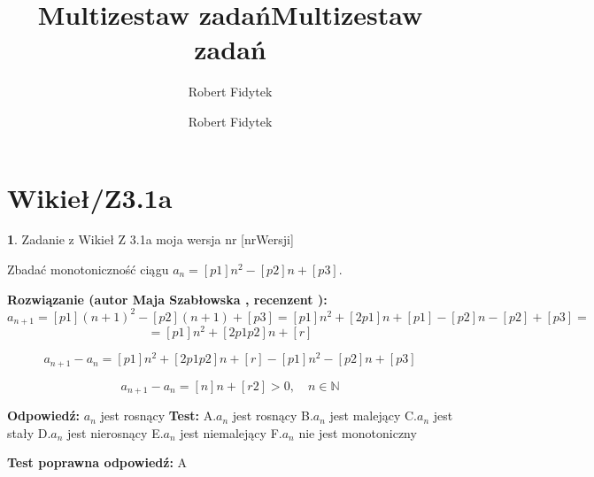 \documentclass[12pt, a4paper]{article}
\title{Multizestaw zadań}
\author{Robert Fidytek}
\date{}\documentclass[12pt, a4paper]{article}
\title{Multizestaw zadań}
\author{Robert Fidytek}
\date{}
\theoremstyle{definition} %
\newtheorem{zad}{}
\theoremstyle{definition} %
\newtheorem{zad}{}
\newcommand{\kategoria}[1]{\section{#1}} %
\newcommand{\zadStart}[1]{\begin{zad}#1\newline} %
\newcommand{\zadStop}{\end{zad}}   %
\newcommand{\rozwStart}[2]{\noindent \textbf{Rozwiązanie (autor #1 , recenzent #2): }\newline} %
\newcommand{\rozwStop}{\newline}                                            %
\newcommand{\odpStart}{\noindent \textbf{Odpowiedź:}\newline}    %
\newcommand{\odpStop}{\newline}                                             %
\newcommand{\testStart}{\noindent \textbf{Test:}\newline} %
\newcommand{\testStop}{\newline} %
\newcommand{\kluczStart}{\noindent \textbf{Test poprawna odpowiedź:}\newline} %
\newcommand{\kluczStop}{\newline} %
\begin{document}
\maketitle


\kategoria{Wikieł/Z3.1a}
\zadStart{Zadanie z Wikieł Z 3.1a moja wersja nr [nrWersji]}


Zbadać monotoniczność ciągu $a_{n}=[p1]n^{2}-[p2]n+[p3]$.

\zadStop

\rozwStart{Maja Szabłowska}{}
$$a_{n+1}=[p1](n+1)^{2}-[p2](n+1)+[p3]=[p1]n^{2}+[2p1]n+[p1]-[p2]n-[p2]+[p3]=$$
$$=[p1]n^{2}+[2p1p2]n+[r]$$

$$a_{n+1}-a_{n}=[p1]n^{2}+[2p1p2]n+[r]-[p1]n^{2}-[p2]n+[p3]$$

$$a_{n+1}-a_{n}=[n]n+[r2] >0, \quad n\in\mathbb{N}$$


\rozwStop


\odpStart
$a_{n}$ jest rosnący
\odpStop
\testStart
A.$a_{n}$ jest rosnący
B.$a_{n}$ jest malejący
C.$a_{n}$ jest stały
D.$a_{n}$ jest nierosnący
E.$a_{n}$ jest niemalejący
F.$a_{n}$ nie jest monotoniczny


\testStop
\kluczStart
A
\kluczStop
\end{document}
